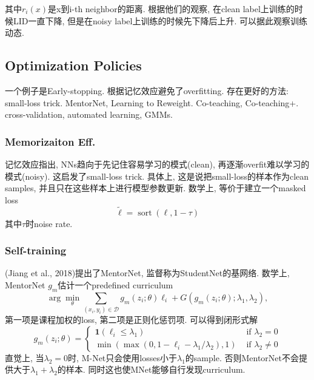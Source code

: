 \documentclass{article}
\begin{document}
其中$r_i(x)$是x到i-th neighbor的距离. 根据他们的观察, 在clean label上训练的时候LID一直下降, 但是在noisy label上训练的时候先下降后上升. 可以据此观察训练动态.

\subsection{Optimization Policies}

一个例子是Early-stopping. 根据记忆效应避免了overfitting. 存在更好的方法: small-loss trick. MentorNet, Learning to Reweight. Co-teaching, Co-teaching+. cross-validation, automated learning, GMMs.

\subsubsection{Memorizaiton Eff.}

记忆效应指出, NNs趋向于先记住容易学习的模式(clean), 再逐渐overfit难以学习的模式(noisy). 这启发了small-loss trick. 具体上, 这是说把small-loss的样本作为clean samples, 并且只在这些样本上进行模型参数更新. 数学上, 等价于建立一个masked loss
\begin{equation}
    \tilde{\ell}=\operatorname{sort}(\ell, 1-\tau)
\end{equation}
其中$\tau$时noise rate.

\subsubsection{Self-training}

(Jiang et al., 2018)提出了MentorNet, 监督称为StudentNet的基网络. 数学上, MentorNet $g_m$估计一个predefined curriculum
\begin{equation}
    \arg \min _{\theta} \sum_{\left(x_{i}, y_{i}\right) \in \mathcal{D}} g_{m}\left(z_{i} ; \theta\right) \ell_{i}+G\left(g_{m}\left(z_{i} ; \theta\right) ; \lambda_{1}, \lambda_{2}\right),
\end{equation}
第一项是课程加权的loss, 第二项是正则化惩罚项. 可以得到闭形式解
\begin{equation}
    g_{m}\left(z_{i} ; \theta\right)=\left\{\begin{array}{ll}
    \mathbf{1}\left(\ell_{i} \leq \lambda_{1}\right) & \text { if } \lambda_{2}=0 \\
    \min \left(\max \left(0,1-\ell_{i}-\lambda_{1} / \lambda_{2}\right), 1\right) & \text { if } \lambda_{2} \neq 0
    \end{array}\right.
\end{equation}
直觉上, 当$\lambda_2 = 0$时, M-Net只会使用losses小于$\lambda_1$的sample. 否则MentorNet不会提供大于$\lambda_1 + \lambda_2$的样本. 同时这也使MNet能够自行发现curriculum.
\end{document}
